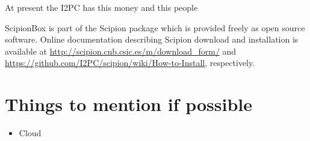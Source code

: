 At present the I2PC has this money and this people

ScipionBox is part of the Scipion package which is provided 
freely as open source software. Online documentation
describing Scipion download and installation is available
at \url{http://scipion.cnb.csic.es/m/download_form/} and \url{https://github.com/I2PC/scipion/wiki/How-to-Install}, respectively.

\section{Things to mention if possible}
\begin{itemize}
 \item Cloud
\end{itemize}
